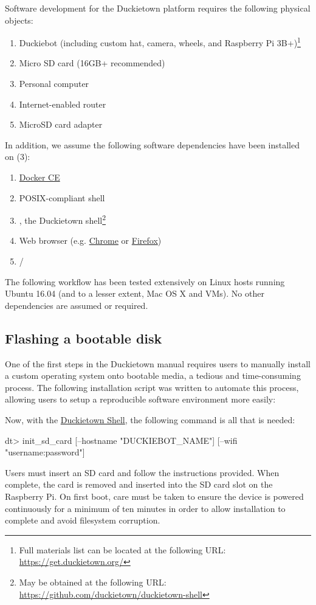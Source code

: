 \noindent Software development for the Duckietown platform requires the following physical objects:
%
\begin{enumerate}
\item Duckiebot (including custom hat, camera, wheels, and Raspberry Pi 3B+)\footnote{Full materials list can be located at the following URL: \url{https://get.duckietown.org/}}
\item Micro SD card (16GB+ recommended)
\item Personal computer
\item Internet-enabled router
\item MicroSD card adapter
\end{enumerate}
%
In addition, we assume the following software dependencies have been installed on (3):
%
\begin{enumerate}[label=(\alph*)]
\item \href{https://get.docker.com}{Docker CE}
\item POSIX-compliant shell
\item {}, the Duckietown shell\footnote{May be obtained at the following URL: \url{https://github.com/duckietown/duckietown-shell}}
\item Web browser (e.g. \href{https://www.google.com/chrome/}{Chrome} or \href{https://mozilla.org/firefox/}{Firefox})
\item {}/
\end{enumerate}

\noindent The following workflow has been tested extensively on Linux hosts running Ubuntu 16.04 (and to a lesser extent, Mac OS X and VMs). No other dependencies are assumed or required.

\subsection{Flashing a bootable disk}

One of the first steps in the Duckietown manual requires users to manually install a custom operating system onto bootable media, a tedious and time-consuming process. The following installation script was written to automate this process, allowing users to setup a reproducible software environment more easily:

%
Now, with the \href{https://github.com/duckietown/duckietown-shell}{Duckietown Shell}, the following command is all that is needed:
%
\begin{dtslisting}
dt> init_sd_card [--hostname "DUCKIEBOT_NAME"] [--wifi "username:password"]
\end{dtslisting}
%
Users must insert an SD card and follow the instructions provided. When complete, the card is removed and inserted into the SD card slot on the Raspberry Pi. On first boot, care must be taken to ensure the device is powered continuously for a minimum of ten minutes in order to allow installation to complete and avoid filesystem corruption.

